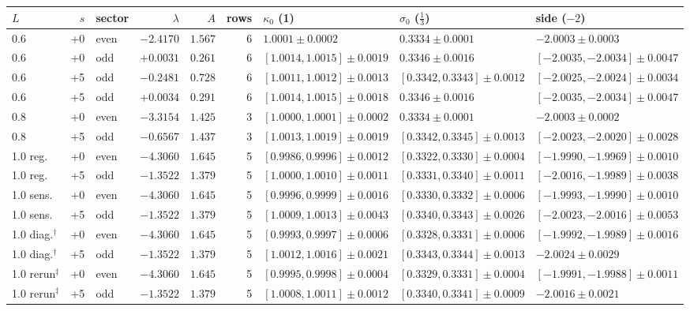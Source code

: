 \begin{tabular}{lrlrrrlll}
\toprule
$L$ & $s$ & sector & $\lambda$ & $A$ & rows & $\kappa_0$ (1) & $\sigma_0$ ($\frac13$) & side ($-2$) \\
\midrule
0.6 & +0 & even & $-2.4170$ & $1.567$ & 6 & $1.0001\pm0.0002$ & $0.3334\pm0.0001$ & $-2.0003\pm0.0003$ \\
0.6 & +0 & odd & $+0.0031$ & $0.261$ & 6 & $[1.0014,1.0015]\pm0.0019$ & $0.3346\pm0.0016$ & $[-2.0035,-2.0034]\pm0.0047$ \\
0.6 & +5 & odd & $-0.2481$ & $0.728$ & 6 & $[1.0011,1.0012]\pm0.0013$ & $[0.3342,0.3343]\pm0.0012$ & $[-2.0025,-2.0024]\pm0.0034$ \\
0.6 & +5 & odd & $+0.0034$ & $0.291$ & 6 & $[1.0014,1.0015]\pm0.0018$ & $0.3346\pm0.0016$ & $[-2.0035,-2.0034]\pm0.0047$ \\
0.8 & +0 & even & $-3.3154$ & $1.425$ & 3 & $[1.0000,1.0001]\pm0.0002$ & $0.3334\pm0.0001$ & $-2.0003\pm0.0002$ \\
0.8 & +5 & odd & $-0.6567$ & $1.437$ & 3 & $[1.0013,1.0019]\pm0.0019$ & $[0.3342,0.3345]\pm0.0013$ & $[-2.0023,-2.0020]\pm0.0028$ \\
1.0 reg. & +0 & even & $-4.3060$ & $1.645$ & 5 & $[0.9986,0.9996]\pm0.0012$ & $[0.3322,0.3330]\pm0.0004$ & $[-1.9990,-1.9969]\pm0.0010$ \\
1.0 reg. & +5 & odd & $-1.3522$ & $1.379$ & 5 & $[1.0000,1.0010]\pm0.0011$ & $[0.3331,0.3340]\pm0.0011$ & $[-2.0016,-1.9989]\pm0.0038$ \\
1.0 sens. & +0 & even & $-4.3060$ & $1.645$ & 5 & $[0.9996,0.9999]\pm0.0016$ & $[0.3330,0.3332]\pm0.0006$ & $[-1.9993,-1.9990]\pm0.0010$ \\
1.0 sens. & +5 & odd & $-1.3522$ & $1.379$ & 5 & $[1.0009,1.0013]\pm0.0043$ & $[0.3340,0.3343]\pm0.0026$ & $[-2.0023,-2.0016]\pm0.0053$ \\
1.0 diag.$^\dagger$ & +0 & even & $-4.3060$ & $1.645$ & 5 & $[0.9993,0.9997]\pm0.0006$ & $[0.3328,0.3331]\pm0.0006$ & $[-1.9992,-1.9989]\pm0.0016$ \\
1.0 diag.$^\dagger$ & +5 & odd & $-1.3522$ & $1.379$ & 5 & $[1.0012,1.0016]\pm0.0021$ & $[0.3343,0.3344]\pm0.0013$ & $-2.0024\pm0.0029$ \\
1.0 rerun$^\ddagger$ & +0 & even & $-4.3060$ & $1.645$ & 5 & $[0.9995,0.9998]\pm0.0004$ & $[0.3329,0.3331]\pm0.0004$ & $[-1.9991,-1.9988]\pm0.0011$ \\
1.0 rerun$^\ddagger$ & +5 & odd & $-1.3522$ & $1.379$ & 5 & $[1.0008,1.0011]\pm0.0012$ & $[0.3340,0.3341]\pm0.0009$ & $-2.0016\pm0.0021$ \\
\bottomrule
\end{tabular}
